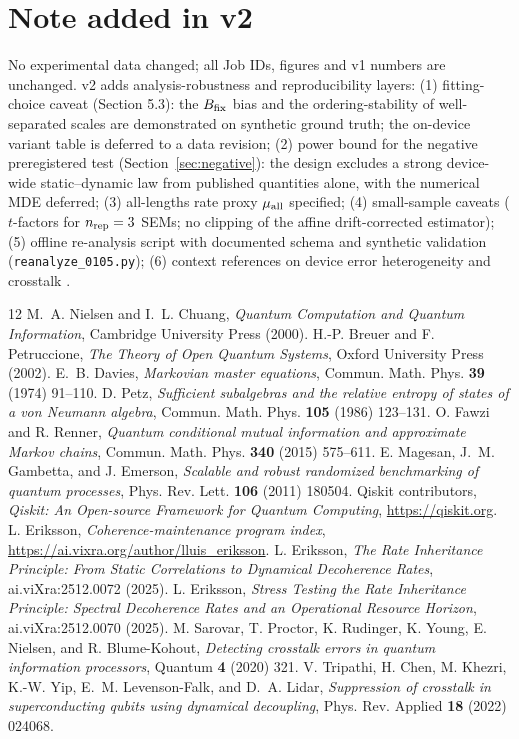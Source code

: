 \documentclass[11pt]{article}
\begin{document}
\section*{Note added in v2}
No experimental data changed; all Job IDs, figures and v1 numbers are
unchanged. v2 adds analysis-robustness and reproducibility layers:
(1) fitting-choice caveat (Section 5.3): the $B_{\rm fix}$ bias and the
ordering-stability of well-separated scales are demonstrated on synthetic
ground truth; the on-device variant table is deferred to a data revision;
(2) power bound for the negative preregistered test
(Section~\ref{sec:negative}): the design excludes a strong device-wide
static--dynamic law from published quantities alone, with the numerical MDE
deferred;
(3) all-lengths rate proxy $\mu_{\rm all}$ specified;
(4) small-sample caveats ($t$-factors for $n_{\rm rep}=3$ SEMs; no clipping
of the affine drift-corrected estimator);
(5) offline re-analysis script with documented schema and synthetic
validation (\texttt{reanalyze\_0105.py});
(6) context references on device error heterogeneity and crosstalk
\cite{Sarovar2020,Tripathi2022}.

\begin{thebibliography}{12}
 M.~A. Nielsen and I.~L. Chuang, \emph{Quantum Computation and
Quantum Information}, Cambridge University Press (2000).
 H.-P. Breuer and F. Petruccione, \emph{The Theory of Open
Quantum Systems}, Oxford University Press (2002).
 E.~B. Davies, \emph{Markovian master equations}, Commun.
Math. Phys. \textbf{39} (1974) 91--110.
 D. Petz, \emph{Sufficient subalgebras and the relative entropy
of states of a von Neumann algebra}, Commun. Math. Phys. \textbf{105} (1986)
123--131.
 O. Fawzi and R. Renner, \emph{Quantum conditional mutual
information and approximate Markov chains}, Commun. Math. Phys. \textbf{340}
(2015) 575--611.
 E. Magesan, J.~M. Gambetta, and J. Emerson, \emph{Scalable and
robust randomized benchmarking of quantum processes}, Phys. Rev. Lett.
\textbf{106} (2011) 180504.
 Qiskit contributors, \emph{Qiskit: An Open-source Framework
for Quantum Computing}, \url{https://qiskit.org}.
 L. Eriksson, \emph{Coherence-maintenance program index},
\url{https://ai.vixra.org/author/lluis_eriksson}.
 L. Eriksson, \emph{The Rate Inheritance Principle: From
Static Correlations to Dynamical Decoherence Rates}, ai.viXra:2512.0072
(2025).
 L. Eriksson, \emph{Stress Testing the Rate Inheritance
Principle: Spectral Decoherence Rates and an Operational Resource Horizon},
ai.viXra:2512.0070 (2025).
 M. Sarovar, T. Proctor, K. Rudinger, K. Young,
E. Nielsen, and R. Blume-Kohout, \emph{Detecting crosstalk errors in quantum
information processors}, Quantum \textbf{4} (2020) 321.
 V. Tripathi, H. Chen, M. Khezri, K.-W. Yip,
E.~M. Levenson-Falk, and D.~A. Lidar, \emph{Suppression of crosstalk in
superconducting qubits using dynamical decoupling}, Phys. Rev. Applied
\textbf{18} (2022) 024068.
\end{thebibliography}
\end{document}
